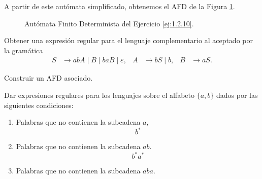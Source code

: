 \begin{ejercicio}
    A partir de este autómata simplificado, obtenemos el AFD de la Figura \ref{fig:ej:1.2.10.afd}.
    \begin{figure}
        \centering
        \caption{Autómata Finito Determinista del Ejercicio \ref{ej:1.2.10}.}
        \label{fig:ej:1.2.10.afd}
    \end{figure}

\end{ejercicio}

\begin{ejercicio}
    Obtener una expresión regular para el lenguaje complementario al aceptado por la gramática
    \begin{align*}
        S &\to abA \mid B \mid baB \mid \varepsilon, & A &\to bS \mid b, & B &\to aS.
    \end{align*}
    \begin{observacion}
        Construir un AFD asociado.
    \end{observacion}
\end{ejercicio}

\begin{ejercicio} \label{ej:1.2.12}
    Dar expresiones regulares para los lenguajes sobre el alfabeto $\{a, b\}$ dados por las siguientes condiciones:
    \begin{enumerate}
        \item Palabras que no contienen la subcadena $a$,
        \begin{equation*}
            b^*
        \end{equation*}
        \item Palabras que no contienen la subcadena $ab$.
        \begin{equation*}
            b^*a^*
        \end{equation*}
        \item Palabras que no contienen la subcadena $aba$.
        
    \end{enumerate}
\end{ejercicio}

